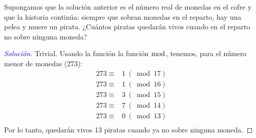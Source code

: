 \documentclass[a4paper,12pt]{article}
\newenvironment{solution}
  {\renewcommand\qedsymbol{$\square$}\begin{proof}[\textcolor{blue}{Solución}]}
  {\end{proof}}
\begin{document}
Supongamos que la solución anterior es el número real de monedas en el cofre y que la historia continúa: siempre que sobran monedas en el reparto, hay una pelea y muere un pirata. ¿Cuántos piratas quedarán vivos cuando en el reparto no sobre ninguna moneda?
\begin{solution}
	Trivial. Usando la función la función $\bmod$, tenemos, para el número menor de monedas (273): 
	\begin{align*}
		273\equiv & 1 \ (\bmod 17) \\
		273\equiv & 1 \ (\bmod 16) \\
		273\equiv & 3 \ (\bmod 15) \\
		273\equiv & 7 \ (\bmod 14) \\
		273\equiv & 0 \ (\bmod 13) \\
	\end{align*}
Por lo tanto, quedarán vivos 13 piratas cuando ya no sobre ninguna moneda.
\end{solution}



\end{document}
